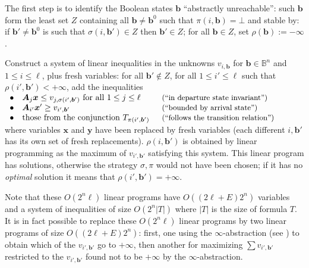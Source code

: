 \documentclass{llncs}
\newcommand{\pponly}[1]{}
\newcommand{\rronly}[1]{#1}
\newcommand{\BB}{\mathbb{B}}
\newcommand{\sleq}{\!\leq\!}
\newcommand{\mat}[1]{{\boldsymbol #1}}
\renewcommand{\vec}[1]{{\boldsymbol #1}}
\begin{document}
The first step is to identify the Boolean states $\vec{b}$
``abstractly unreachable'': such $\vec{b}$ form the least set $Z$
containing all $\vec{b} \neq \vec{b}^0$ such that
$\pi(i,\vec{b})=\bot$ and stable by: if $\vec{b}' \neq \vec{b}^0$ is
such that $\sigma(i,\vec{b}') \in Z$ then $\vec{b}' \in Z$; for all
$\vec{b} \in Z$, set $\rho(\vec{b}):=-\vec{\infty}$.

Construct a system of linear inequalities in the unknowns
$v_{i,\vec{b}}$ for $\vec{b} \in \BB^n$ and $1 \sleq i \sleq \ell$, plus
fresh variables: for all $\vec{b}' \notin Z$, for all $1 \leq i' \leq
\ell$ such that $\rho(i',\vec{b}') < +\infty$, add the inequalities\\
\hspace*{1em}$
\begin{array}{ll@{\hspace{1.5em}}l}
\bullet & \mat{A}_j\vec{x} \leq v_{j,\sigma(i',\vec{b}')}\text{ for all }1 \leq
j \leq \ell & \text{\small(``in departure state invariant'')} \\
\bullet & \mat{A}_{i'}\vec{x}' \geq v_{i',\vec{b}'} & 
\text{\small(``bounded by arrival state'')}\\
\bullet & \text{those from the conjunction }T_{\pi(i',\vec{b}')} &
\text{\small(``follows the transition relation'')}
\end{array}$\\
where variables $\vec{x}$ and $\vec{y}$ have been replaced
by fresh variables (each different $i,\vec{b}'$ has its own set of
fresh replacements).  $\rho(i,\vec{b}')$ is obtained by linear
programming as the maximum of $v_{i',\vec{b}'}$ satisfying this
system.  This linear program has solutions, otherwise the strategy
$\sigma,\pi$ would not have been chosen; if it has no \emph{optimal} solution
it means that $\rho(i',\vec{b}')=+\infty$.

Note that these $O(2^n \ell)$ linear programs have \pponly{$O(2^n \ell)$}\rronly{$O((2\ell+E)2^n)$} variables and a system of inequalities of size
$O(2^n |T|)$ where $|T|$ is the size of formula $T$. It is in fact
possible to replace these $O(2^n \ell)$ linear programs by two linear
programs of size \pponly{$O(2^n \ell)$}\rronly{$O((2\ell+E)2^n)$}: first,
one using the $\infty$-abstraction (see
\cite[\S8,9]{Gawlitza:2011:SSR:1961204.1961207}) to obtain which of
the $v_{i',\vec{b}'}$ go to $+\infty$, then another for maximizing
$\sum v_{i',\vec{b}'}$ restricted to the $v_{i',\vec{b}'}$ found not
to be $+\infty$ by the $\infty$-abstraction.
\end{document}
